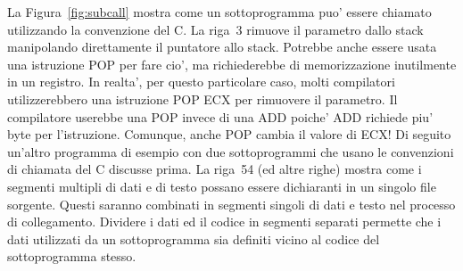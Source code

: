 La Figura~\ref{fig:subcall} mostra come un sottoprogramma puo' essere
chiamato utilizzando la convenzione del C. La riga~3 rimuove il
parametro dallo stack manipolando direttamente il puntatore allo stack.
Potrebbe anche essere usata una istruzione {\code POP} per fare cio', ma
richiederebbe di memorizzazione inutilmente in un registro. In realta',
per questo particolare caso, molti compilatori utilizzerebbero una 
istruzione {\code POP ECX} per rimuovere il parametro. Il compilatore
userebbe una {\code POP} invece di una {\code ADD} poiche' {\code ADD}
richiede piu' byte per l'istruzione. Comunque, anche {\code POP} cambia
il valore di ECX! Di seguito un'altro programma di esempio con due 
sottoprogrammi che usano le convenzioni di chiamata del C discusse
prima. La riga~54 (ed altre righe) mostra come i segmenti multipli 
di dati e di testo possano essere dichiaranti in un singolo file sorgente.
Questi saranno combinati in segmenti singoli di dati e testo nel
processo di collegamento. Dividere i dati ed il codice in segmenti
separati permette che i dati utilizzati da un sottoprogramma sia definiti
vicino al codice del sottoprogramma stesso.

